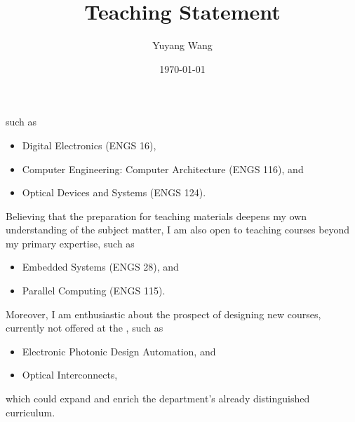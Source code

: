 



\title{Teaching Statement}

\def\courseOneName{Digital Electronics}
\def\courseOneNumber{ENGS 16}
\def\courseTwoName{Computer Engineering: Computer Architecture}
\def\courseTwoNumber{ENGS 116}
\def\courseThreeName{Optical Devices and Systems}
\def\courseThreeNumber{ENGS 124}
\def\courseFourName{Embedded Systems}
\def\courseFourNumber{ENGS 28}
\def\courseFiveName{Parallel Computing}
\def\courseFiveNumber{ENGS 115}
\def\courseSixName{Electronic Photonic Design Automation}
\def\courseSevenName{Optical Interconnects}

\def\rsCustom{%
such as 
\begin{itemize}[nosep]
    \item \courseOneName{} (\courseOneNumber{}),
    \item \courseTwoName{} (\courseTwoNumber{}), and
    \item \courseThreeName{} (\courseThreeNumber{}).
\end{itemize}
Believing that the preparation for teaching materials deepens my own understanding of the subject matter, I am also open to teaching courses beyond my primary expertise, such as
\begin{itemize}[nosep]
    \item \courseFourName{} (\courseFourNumber{}), and
    \item \courseFiveName{} (\courseFiveNumber{}).
\end{itemize}
Moreover, I am enthusiastic about the prospect of designing new courses, currently not offered at the \appSchool{}, such as
\begin{itemize}[nosep]
    \item \courseSixName{}, and 
    \item \courseSevenName{},
\end{itemize}
which could expand and enrich the department's already distinguished curriculum.
}

\author{Yuyang Wang}
\date{\today}
\makeatletter
\fancyfoot[L]{\scshape \MakeLowercase{\@author}}
\fancyfoot[R]{{\scshape \MakeLowercase{\@title}}\quad{\LARGE\sfrac{\thepage}{\pageref*{LastPage}}}}
\makeatother



\maketitle%
\thispagestyle{fancy}


\rsCustom{}


\footnotesize


